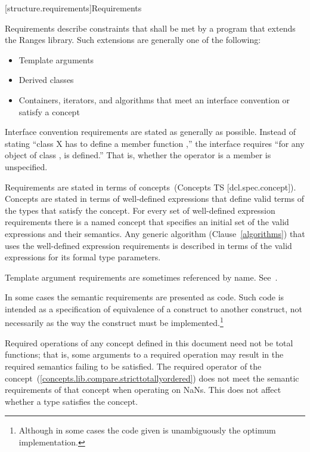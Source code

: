 [structure.requirements]{Requirements}

\pnum
{}%
Requirements describe constraints that shall be met by a \Cpp program that extends the Ranges library.
Such extensions are generally one of the following:

\begin{itemize}
\item Template arguments
\item Derived classes
\item Containers, iterators, and algorithms that meet an interface convention
or satisfy a concept
\end{itemize}

\pnum
Interface convention requirements are stated as generally as possible. Instead
of stating ``class X has to define a member function ,'' the
interface requires ``for any object  of class ,  is
defined.'' That is, whether the operator is a member is unspecified.

\pnum
Requirements are stated in terms of concepts~(Concepts TS [dcl.spec.concept]).
Concepts are stated in terms of well-defined expressions that define valid terms of
the types that satisfy the concept. For every set of
well-defined expression requirements there is a named concept that
specifies an initial set of the valid expressions and their semantics. Any generic
algorithm (Clause~\ref{algorithms}) that uses the well-defined expression requirements
is described in terms of the valid expressions for its formal type parameters. 

\pnum
Template argument requirements are sometimes referenced by name.
See~.

\pnum
In some cases the semantic requirements are presented as \Cpp code.
Such code is intended as a
specification of equivalence of a construct to another construct, not
necessarily as the way the construct
must be implemented.\footnote{Although in some cases the code given is
unambiguously the optimum implementation.}

\pnum
Required operations of any concept defined in this document need not be
total functions; that is, some arguments to a required operation may
result in the required semantics failing to be satisfied. \enterexample
The required \tcode{<} operator of the 
concept~(\ref{concepts.lib.compare.stricttotallyordered}) does not meet the
semantic requirements of that concept when operating on NaNs.\exitexample
This does not affect whether a type satisfies the concept.

